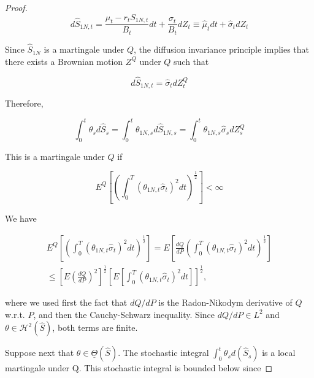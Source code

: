 \documentclass[\topdir/lecture\_notes.tex]{subfiles}
\begin{document}
\begin{proof}
\begin{equation*}
d \hat{S}_{1 N, t}=\frac{\mu_{t}-r_{t} S_{1 N, t}}{B_{t}} d t+\frac{\sigma_{t}}{B_{t}} d Z_{t} \equiv \hat{\mu}_{t} d t+\hat{\sigma}_{t} d Z_{t}
\end{equation*}

Since $\hat{S}_{1 N}$ is a martingale under $Q$, the diffusion invariance principle implies that there exists a Brownian motion $Z^{Q}$ under $Q$ such that

\begin{equation*}
d \hat{S}_{1 N, t}=\hat{\sigma}_{t} d Z_{t}^{Q}
\end{equation*}

Therefore,

\begin{equation*}
\int_{0}^{t} \theta_{s} d \hat{S}_{s}=\int_{0}^{t} \theta_{1 N, s} d \hat{S}_{1 N, s}=\int_{0}^{t} \theta_{1 N, s} \hat{\sigma}_{s} d Z_{s}^{Q}
\end{equation*}

This is a martingale under $Q$ if

\begin{equation*}
E^{Q}\left[\left(\int_{0}^{T}\left(\theta_{1 N, t} \hat{\sigma}_{t}\right)^{2} d t\right)^{\frac{1}{2}}\right]<\infty
\end{equation*}

We have

\begin{equation*}
\begin{gathered}
E^{Q}\left[\left(\int_{0}^{T}\left(\theta_{1 N, t} \hat{\sigma}_{t}\right)^{2} d t\right)^{\frac{1}{2}}\right]=E\left[\frac{d Q}{d P}\left(\int_{0}^{T}\left(\theta_{1 N, t} \hat{\sigma}_{t}\right)^{2} d t\right)^{\frac{1}{2}}\right] \\
\leq\left[E\left(\frac{d Q}{d P}\right)^{2}\right]^{\frac{1}{2}}\left[E\left[\int_{0}^{T}\left(\theta_{1 N, t} \hat{\sigma}_{t}\right)^{2} d t\right]\right]^{\frac{1}{2}},
\end{gathered}
\end{equation*}

where we used first the fact that $d Q / d P$ is the Radon-Nikodym derivative of $Q$ w.r.t. $P$, and then the Cauchy-Schwarz inequality. Since $d Q / d P \in L^{2}$ and $\theta \in \mathcal{H}^{2}(\hat{S})$, both terms are finite.

Suppose next that $\theta \in \underline{\Theta}(\hat{S})$. The stochastic integral $\int_{0}^{t} \theta_{s} d\left(\hat{S}_{s}\right)$ is a local martingale under Q. This stochastic integral is bounded below since


\end{proof}
\end{document}
